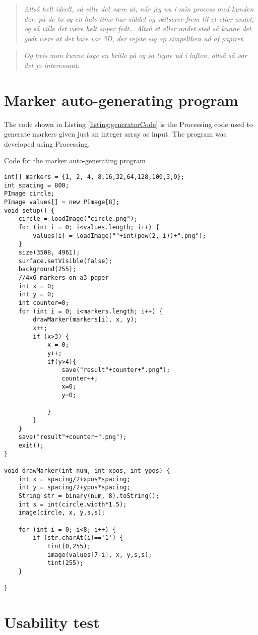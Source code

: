 \begin{quote}
	\textit{Altså helt ideelt, så ville det være at, når jeg nu i min process med kunden der, på de to og en halv time har siddet og skitserer frem til et eller andet, og så ville det være helt super fedt… Altså et eller andet sted så kunne det godt være at det bare var 3D, der rejste sig op simpelthen ud af papiret}\label{quote:expertIdeas3Danish}.\\
\end{quote}

\begin{quote}
	\textit{Og hvis man kunne tage en brille på og så tegne ud i luften, altså så var det jo interessant}\label{quote:expertIdeas4Danish}.\\
\end{quote}



\section*{Marker auto-generating program}
The code shown in Listing \ref{listing:generatorCode} is the Processing code used to generate markers given just an integer array as input. The program was developed using Processing.

\begin{listing}[H]
	\caption{Code for the marker auto-generating program}
	\label{listing:generatorCode}
	\begin{verbatim}
int[] markers = {1, 2, 4, 8,16,32,64,128,100,3,9};
int spacing = 800;
PImage circle;
PImage values[] = new PImage[8];
void setup() {
	circle = loadImage("circle.png");
	for (int i = 0; i<values.length; i++) {
		values[i] = loadImage(""+int(pow(2, i))+".png");
	}
	size(3508, 4961);
	surface.setVisible(false);
	background(255);
	//4x6 markers on a3 paper
	int x = 0;
	int y = 0;
	int counter=0;
	for (int i = 0; i<markers.length; i++) {
		drawMarker(markers[i], x, y);
		x++;
		if (x>3) {
			x = 0;
			y++;
			if(y>4){
				save("result"+counter+".png");
				counter++;
				x=0;
				y=0;
				
			}
		}
	}
	save("result"+counter+".png");
	exit();
}

void drawMarker(int num, int xpos, int ypos) {
	int x = spacing/2+xpos*spacing;
	int y = spacing/2+ypos*spacing;
	String str = binary(num, 8).toString();
	int s = int(circle.width*1.5);
	image(circle, x, y,s,s);
	
	for (int i = 0; i<8; i++) {
		if (str.charAt(i)=='1') {
			tint(0,255);
			image(values[7-i], x, y,s,s);
			tint(255); 
	}
	
}
	\end{verbatim}
\end{listing}

\section{Usability test}
\begin{comment}


\end{comment}

